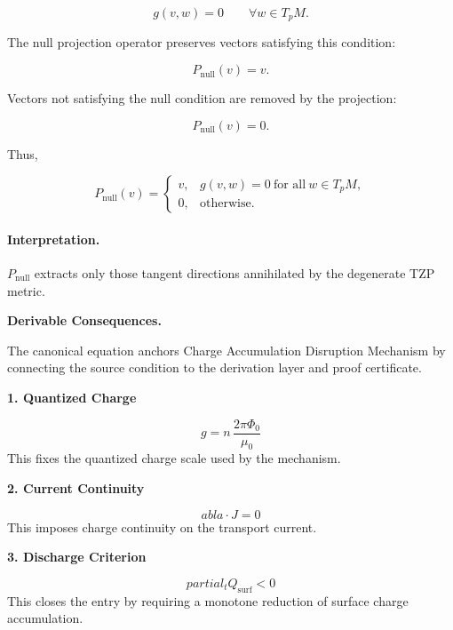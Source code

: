 \begin{equation}
g(v,w)=0
\qquad
\forall w\in T_pM .
\end{equation}

The null projection operator preserves vectors satisfying this condition:

\begin{equation}
P_{\mathrm{null}}(v)=v .
\end{equation}

Vectors not satisfying the null condition are removed by the projection:

\begin{equation}
P_{\mathrm{null}}(v)=0 .
\end{equation}

Thus,

\begin{equation}
\boxed{
P_{\mathrm{null}}(v)
=
\begin{cases}
v, & g(v,w)=0\ \text{for all}\ w\in T_pM,\\
0, & \text{otherwise}.
\end{cases}
}
\end{equation}

\paragraph{Interpretation.}
$P_{\mathrm{null}}$ extracts only those tangent directions annihilated by the degenerate TZP metric.

\par\vspace{0.35em}
\noindent\textbf{Derivable Consequences.}\quad
\begingroup
\footnotesize
\raggedright
The canonical equation anchors Charge Accumulation Disruption Mechanism by connecting the source condition to the derivation layer and proof certificate.
\par\endgroup

\noindent\textbf{1. Quantized Charge}\par
\[
g = n\,\frac{2\pi \Phi_0}{\mu_0}
\]
\noindent This fixes the quantized charge scale used by the mechanism.\par
\noindent\textbf{2. Current Continuity}\par
\[
abla \cdot J = 0
\]
\noindent This imposes charge continuity on the transport current.\par
\noindent\textbf{3. Discharge Criterion}\par
\[
partial_t Q_{\mathrm{surf}} < 0
\]
\noindent This closes the entry by requiring a monotone reduction of surface charge accumulation.\par

